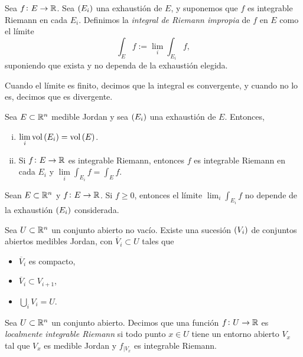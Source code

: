 \begin{defi}
    Sea $f \colon E \to \mathbb{R}$. Sea $\left( E_i \right)$ una exhaustión de $E$, y suponemos que $f$ es integrable Riemann en cada $E_i$. Definimos la \textit{integral de Riemann impropia} de $f$ en $E$ como el límite
    \[
        \int_E f := \lim\limits_i \int_{E_i} f,
    \]
    suponiendo que exista y no dependa de la exhaustión elegida.

    Cuando el límite es finito, decimos que la integral es convergente, y cuando no lo es, decimos que es divergente.
\end{defi}

\begin{prop}
    Sea $E \subset \mathbb{R}^n$ medible Jordan y sea $\left( E_i \right)$ una exhaustión de $E$. Entonces,
    \begin{enumerate}[(i)]
        \item $\lim\limits_i \operatorname{vol} \left( E_i \right) = \operatorname{vol} \left( E \right)$.
        \item Si $f \colon E \to \mathbb{R} $ es integrable Riemann, entonces $f$ es integrable Riemann en cada $E_i$ y $\lim\limits_i \int_{E_i} f = \int_E f$.
    \end{enumerate}
\end{prop}

\begin{prop}
    Sean $E \subset \mathbb{R}^n$ y $f \colon E \to \mathbb{R}$. Si $f\geq 0$, entonces el límite $\lim_i \int_{E_i} f$ no depende de la exhaustión $\left( E_i \right)$ considerada.
\end{prop}

\begin{lema}[(de la cebolla)]
    Sea $U \subset \mathbb{R}^n$ un conjunto abierto no vacío. Existe una sucesión $\left( V_i \right) $ de conjuntos abiertos medibles Jordan, con $\overline{V}_i \subset U$ tales que
    \begin{itemize}
        \item $\overline{V}_i$ es compacto,
        \item $\overline{V}_i \subset V_{i+1}$,
        \item $\bigcup\limits_i V_i = U$.
    \end{itemize}
\end{lema}

\begin{defi}
    Sea $U \subset \mathbb{R}^n$ un conjunto abierto. Decimos que una función $f \colon U \to \mathbb{R}$ es \textit{localmente integrable Riemann} si todo punto $x \in U$ tiene un entorno abierto $V_x$ tal que $V_x$ es medible Jordan y $f_{|V_x}$ es integrable Riemann.
\end{defi}


